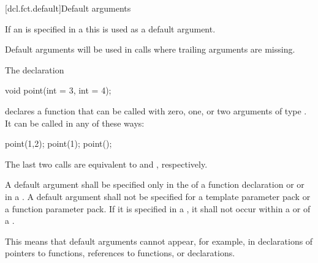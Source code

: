 [dcl.fct.default]{Default arguments}%

\pnum
If an  is specified in a
 this
is used as a default argument.
\begin{note}
Default arguments will be used in calls
where trailing arguments are missing.
\end{note}

\pnum
{}%
\begin{example}
The declaration
\begin{codeblock}
void point(int = 3, int = 4);
\end{codeblock}
declares a function that can be called with zero, one, or two arguments of type
.
It can be called in any of these ways:
\begin{codeblock}
point(1,2);  point(1);  point();
\end{codeblock}

The last two calls are equivalent to
and
,
respectively.
\end{example}

\pnum
A default argument shall be specified only in the
of a function declaration
or 
or in a
.
A default argument shall not be specified for
a template parameter pack or
a function parameter pack.
If it is specified in a
,
it shall not occur within a
or
of a
.
\begin{footnote}
This means that default
arguments cannot appear,
for example, in declarations of pointers to functions,
references to functions, or
declarations.
\end{footnote}

